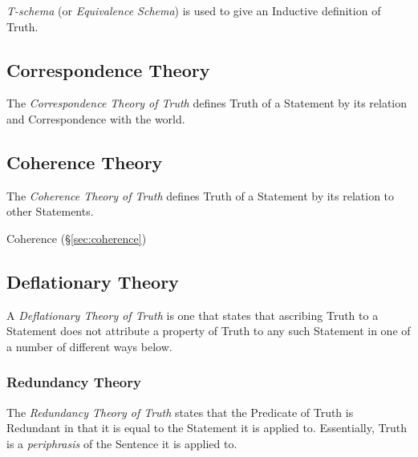 \emph{T-schema} (or \emph{Equivalence Schema}) is used to give an
Inductive definition of Truth.



\subsection{Correspondence Theory}\label{sec:correspondence_truth}

The \emph{Correspondence Theory of Truth} defines Truth of a Statement
by its relation and Correspondence with the world.



\subsection{Coherence Theory}\label{sec:coherence_theory}

The \emph{Coherence Theory of Truth} defines Truth of a Statement by its
relation to other Statements.

\fist Coherence (\S\ref{sec:coherence})



\subsection{Deflationary Theory}\label{sec:deflationary_truth}

A \emph{Deflationary Theory of Truth} is one that states that
ascribing Truth to a Statement does not attribute a property of Truth
to any such Statement in one of a number of different ways below.



\subsubsection{Redundancy Theory}\label{sec:redundancy_theory}

The \emph{Redundancy Theory of Truth} states that the Predicate of
Truth is Redundant in that it is equal to the Statement it is applied
to.\cite{ramsey27} Essentially, Truth is a \emph{periphrasis} of the
Sentence it is applied to.



